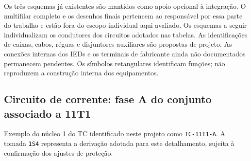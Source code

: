 \documentclass[11pt,a4paper]{article}
\begin{document}
Os três esquemas já existentes são mantidos como apoio opcional à integração.
O multifilar completo e os desenhos finais pertencem ao responsável por essa
parte do trabalho e estão fora do escopo individual aqui avaliado.
Os esquemas a seguir individualizam os condutores dos circuitos adotados
nas tabelas. As identificações de caixas, cabos, réguas e disjuntores
auxiliares são propostas de projeto. As conexões internas dos IEDs e os
terminais de fabricante ainda não documentados permanecem pendentes.
Os símbolos retangulares identificam funções; não reproduzem a construção
interna dos equipamentos.

\subsection{Circuito de corrente: fase A do conjunto associado a 11T1}

Exemplo do núcleo 1 do TC identificado neste projeto como
\texttt{TC-11T1-A}. A tomada \texttt{1S4} representa a derivação adotada
para este detalhamento, sujeita à confirmação dos ajustes de proteção.
\end{document}
